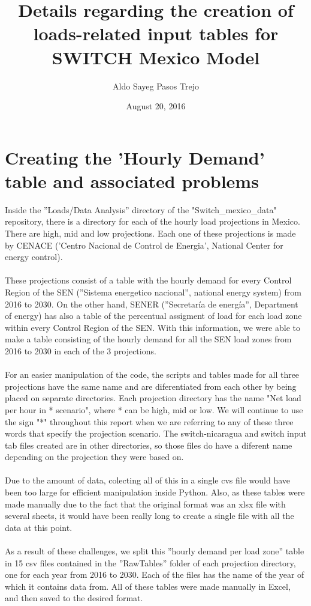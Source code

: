 \documentclass{article}
\author[1,2]{Aldo Sayeg Pasos Trejo}
\affil[1]{\textit{Physics Departament. Facultad de Ciencias. Universidad Nacional Autonoma de Mexico}}
\affil[2]{\textit{Visiting Student Researcher for the Berkeley Energy and Climate Institute at University of California, Berkeley}}
\date{August 20, 2016}
\title{Details regarding the creation of loads-related input tables for SWITCH Mexico Model}
\begin{document}
\maketitle
\section{Creating the 'Hourly Demand' table and associated problems}
Inside the ''Loads/Data Analysis'' directory of the "Switch\_mexico\_data" repository, there is a directory for each of the hourly load projections in Mexico. There are high, mid and low projections. Each one of these projections is made by CENACE ('Centro Nacional de Control de Energia', National Center for energy control)\cite{pagina1}. 
\\
\\These projections consist of a table with the hourly demand for every Control Region of the SEN (''Sistema energetico nacional'', national energy system) from 2016 to 2030. On the other hand, SENER (''Secretaría de energía'', Department of energy) has also a table of the percentual assigment of load for each load zone within every Control Region of the SEN. With this information, we were able to make a table consisting of the hourly demand for all the SEN load zones from 2016 to 2030 in each of the 3 projections. 
\\
\\For an easier manipulation of the code, the scripts and tables made for all three projections have the same name and are diferentiated from each other by being placed on separate directories. Each projection directory has the name "Net load per hour in * scenario", where * can be high, mid or low. We will continue to use the sign "*" throughout this report when we are referring to any of these three words that specify the projection scenario. The switch-nicaragua and switch input tab files created are in other directories, so those files do have a diferent name depending on the projection they were based on.
\\
\\Due to the amount of data, colecting all of this in a single cvs file would have been too large for efficient manipulation inside Python. Also, as these tables were made manually due to the fact that the original format was an xlsx file with several sheets, it would have been really long to create a single file with all the data at this point. 
\\
\\As a result of these challenges, we split this ''hourly demand per load zone'' table in 15 csv files contained in the ''RawTables'' folder of each projection directory, one for each year from 2016 to 2030. Each of the files has the name of the year of which it contains data from. All of these tables were made manually in Excel, and then saved to the desired format.
\end{document}
